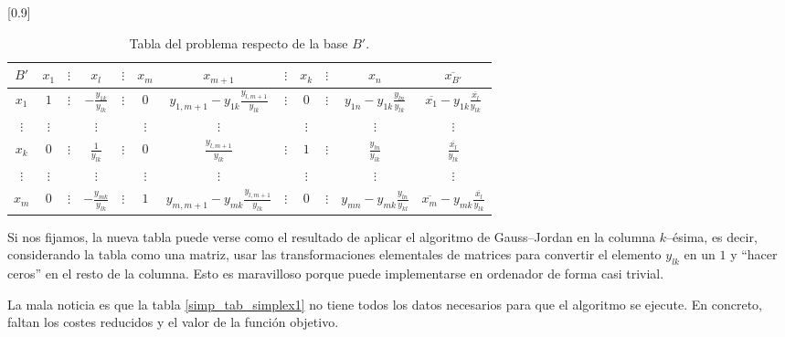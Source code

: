 \begin{table}[H]
	\centering
	\scalebox{0.9}[0.9]{
	\begin{tabular}{c|cccccccccc|c}
		$B'$     & $x_1$    & $\vdots$ & $x_l$                    & $\vdots$ & $x_m$    & $x_{m+1}$                                  & $\vdots$ & $x_k$    & $\vdots$ & $x_n$                                & $\overline{x_{B'}}$                                  \\ \hline
		$x_1$    & $1$      & $\vdots$ & $-\frac{y_{1k}}{y_{lk}}$ & $\vdots$ & $0$      & $y_{1,m+1}-y_{1k}\frac{y_{l,m+1}}{y_{lk}}$ & $\vdots$ & $0$      & $\vdots$ & $y_{1n}-y_{1k}\frac{y_{ln}}{y_{lk}}$ & $\overline{x_1}-y_{1k}\frac{\overline{x_l}}{y_{lk}}$ \\
		$\vdots$ & $\vdots$ &          & $\vdots$                 &          & $\vdots$ & $\vdots$                                   &          & $\vdots$ &          & $\vdots$                             & $\vdots$                                             \\
		$x_k$    & $0$      & $\vdots$ & $\frac{1}{y_{lk}}$       & $\vdots$ & $0$      & $\frac{y_{l,m+1}}{y_{lk}}$                 & $\vdots$ & $1$      & $\vdots$ & $\frac{y_{ln}}{y_{lk}}$              & $\frac{\overline{x_l}}{y_{lk}}$                      \\
		$\vdots$ & $\vdots$ &          & $\vdots$                 &          & $\vdots$ & $\vdots$                                   &          & $\vdots$ &          & $\vdots$                             & $\vdots$                                             \\
		$x_m$    & $0$      & $\vdots$ & $-\frac{y_{mk}}{y_{lk}}$ & $\vdots$ & $1$      & $y_{m,m+1}-y_{mk}\frac{y_{l,m+1}}{y_{lk}}$ & $\vdots$ & $0$      & $\vdots$ & $y_{mn}-y_{mk}\frac{y_{ln}}{y_{kl}}$ & $\overline{x_m}-y_{mk}\frac{\overline{x_l}}{y_{lk}}$ \\ \hline
	\end{tabular}
	}
	\caption{Tabla del problema respecto de la base $B'$.}
\end{table}
Si nos fijamos, la nueva tabla puede verse como el resultado de aplicar el algoritmo de Gauss--Jordan en la columna $k$--ésima, es decir, considerando la tabla como una matriz, usar las transformaciones elementales de matrices para convertir el elemento $y_{lk}$ en un $1$ y ``hacer ceros'' en el resto de la columna. Esto es maravilloso porque puede implementarse en ordenador de forma casi trivial.

La mala noticia es que la tabla \ref{simp_tab_simplex1} no tiene todos los datos necesarios para que el algoritmo se ejecute. En concreto, faltan los costes reducidos y el valor de la función objetivo.

